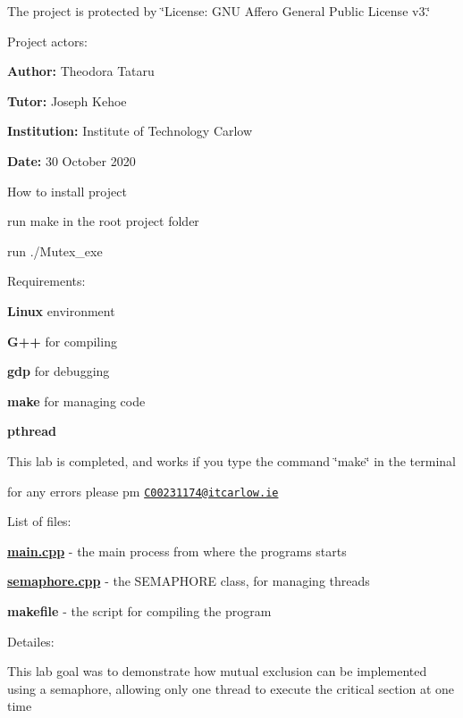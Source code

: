 
\begin{DoxyEnumerate}
\item The project is protected by \char`\"{}\+License\+: G\+N\+U Affero General Public License v3.\char`\"{}
\item Project actors\+:
\begin{DoxyItemize}
\item {\bfseries Author\+:} Theodora Tataru
\item {\bfseries Tutor\+:} Joseph Kehoe
\item {\bfseries Institution\+:} Institute of Technology Carlow
\item {\bfseries Date\+:} 30 October 2020
\end{DoxyItemize}
\item How to install project
\begin{DoxyItemize}
\item run \textquotesingle{}make\textquotesingle{} in the root project folder
\item run ./\+Mutex\+\_\+exe
\end{DoxyItemize}
\item Requirements\+:
\begin{DoxyItemize}
\item {\bfseries  Linux } environment
\item {\bfseries  G++ } for compiling
\item {\bfseries  gdp } for debugging
\item {\bfseries  make } for managing code
\item {\bfseries  pthread }
\end{DoxyItemize}
\item This lab is completed, and works if you type the command \char`\"{}make\char`\"{} in the terminal
\begin{DoxyItemize}
\item for any errors please pm \href{mailto:C00231174@itcarlow.ie}{\tt C00231174@itcarlow.\+ie}
\end{DoxyItemize}
\item List of files\+:
\begin{DoxyItemize}
\item {\bfseries \hyperlink{main_8cpp}{main.\+cpp} }-\/ the main process from where the programs starts
\item {\bfseries \hyperlink{_semaphore_8cpp}{semaphore.\+cpp} }-\/ the S\+E\+M\+A\+P\+H\+O\+RE class, for managing threads
\item {\bfseries makefile }-\/ the script for compiling the program
\end{DoxyItemize}
\item Detailes\+:
\begin{DoxyItemize}
\item This lab goal was to demonstrate how mutual exclusion can be implemented using a semaphore, allowing only one thread to execute the critical section at one time 
\end{DoxyItemize}
\end{DoxyEnumerate}